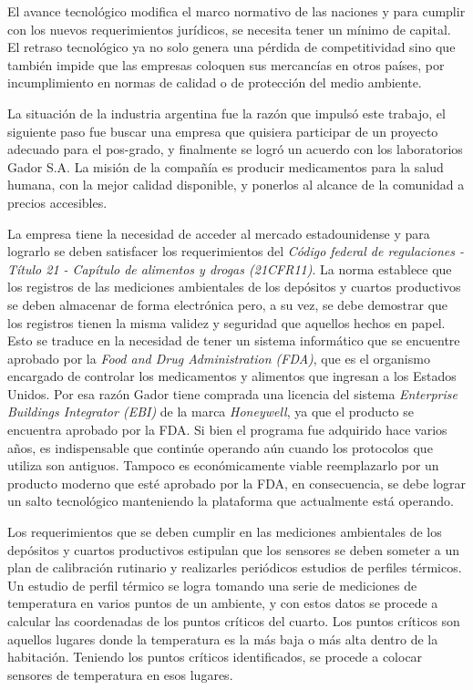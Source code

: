 El avance tecnológico modifica el marco normativo de las naciones y para cumplir con los nuevos requerimientos jurídicos, se necesita tener un mínimo de capital.
El retraso tecnológico ya no solo genera una pérdida de competitividad sino que también impide que las empresas coloquen sus mercancías en otros países, por incumplimiento en normas de calidad o de protección del medio ambiente.
		
La situación de la industria argentina fue la razón que impulsó este trabajo, el siguiente paso fue buscar una empresa que quisiera participar de un proyecto adecuado para el pos-grado, y finalmente se logró un acuerdo con los laboratorios Gador S.A. La misión de la compañía es producir medicamentos para la salud humana, con la mejor calidad disponible, y ponerlos al alcance de la comunidad a precios accesibles. \citep{WEBSITE:Gador}

La empresa tiene la necesidad de acceder al mercado estadounidense y para lograrlo se deben satisfacer los requerimientos del \emph{Código federal de regulaciones - Título 21 - Capítulo de alimentos y drogas (21CFR11)}. \citep{ARTICLE:21cfr11}
La norma establece que los registros de las mediciones ambientales de los depósitos y cuartos productivos se deben almacenar de forma electrónica pero, a su vez, se debe demostrar que los registros tienen la misma validez y seguridad que aquellos hechos en papel. 
Esto se traduce en la necesidad de tener un sistema informático que se encuentre aprobado por la \emph{Food and Drug Administration (FDA)}, que es el organismo encargado de controlar los medicamentos y alimentos que ingresan a los Estados Unidos.
Por esa razón Gador tiene comprada una licencia del sistema \emph{Enterprise Buildings Integrator (EBI)} de la marca \emph{Honeywell}, ya que el producto se encuentra aprobado por la FDA. 
Si bien el programa fue adquirido hace varios años, es indispensable que continúe operando aún cuando los protocolos que utiliza son antiguos.
Tampoco es económicamente viable reemplazarlo por un producto moderno que esté aprobado por la FDA, en consecuencia, se debe lograr un salto tecnológico manteniendo la plataforma que actualmente está operando.

Los requerimientos que se deben cumplir en las mediciones ambientales de los depósitos y cuartos productivos estipulan que los sensores se deben someter a un plan de calibración rutinario y realizarles periódicos estudios de perfiles térmicos.
Un estudio de perfil térmico se logra tomando una serie de mediciones de temperatura en varios puntos de un ambiente, y con estos datos se procede a calcular las coordenadas de los puntos críticos del cuarto. \citep{ARTICLE:Temperature}
Los puntos críticos son aquellos lugares donde la temperatura es la más baja o más alta dentro de la habitación.
Teniendo los puntos críticos identificados, se procede a colocar sensores de temperatura en esos lugares.

